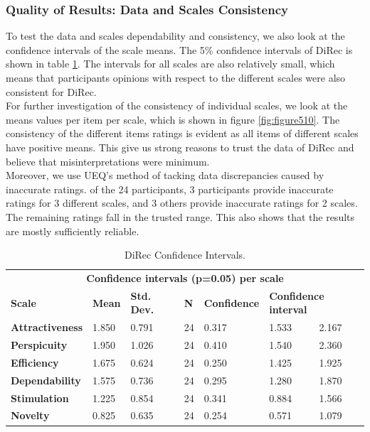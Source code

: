 \subsubsection{Quality of Results: Data and Scales Consistency}
To test the data and scales dependability and consistency, we also look at
the confidence intervals of the scale means. The 5\% confidence intervals of
DiRec is shown in table \ref{table:table57}. The intervals for all scales are
also relatively small, which means that participants opinions with respect to
the different scales were also consistent for DiRec.\\
For further investigation of the consistency of individual scales, we look at
the means values per item per scale, which is shown in figure
\ref{fig:figure510}. The consistency of the different items ratings is evident
as all items of different scales have positive means. This give us strong
reasons to trust the data of DiRec and believe that misinterpretations were
minimum.\\
Moreover, we use UEQ's method of tacking data discrepancies caused by
inaccurate ratings. of the 24 participants, 3 participants provide inaccurate
ratings for 3 different scales, and 3 others provide inaccurate ratings for 2
scales. The remaining ratings fall in the trusted range. This also shows that
the results are mostly sufficiently reliable.
\begin{table}[!htbp]
\tiny
\centering
\begin{tabular}{lllllll}
\multicolumn{7}{c}{\textbf{Confidence intervals (p=0.05) per scale}}                                                                               \\
\textbf{Scale}          & \textbf{Mean} & \textbf{Std. Dev.} & \textbf{N} & \textbf{Confidence} & \multicolumn{2}{l}{\textbf{Confidence interval}} \\
\textbf{Attractiveness} & 1.850         & 0.791              & 24         & 0.317               & 1.533                   & 2.167                  \\
\textbf{Perspicuity}    & 1.950         & 1.026              & 24         & 0.410               & 1.540                   & 2.360                  \\
\textbf{Efficiency}     & 1.675         & 0.624              & 24         & 0.250               & 1.425                   & 1.925                  \\
\textbf{Dependability}  & 1.575         & 0.736              & 24         & 0.295               & 1.280                   & 1.870                  \\
\textbf{Stimulation}    & 1.225         & 0.854              & 24         & 0.341               & 0.884                   & 1.566                  \\
\textbf{Novelty}        & 0.825         & 0.635              & 24         & 0.254               & 0.571                   & 1.079                 
\end{tabular}
\caption{DiRec Confidence Intervals.}
\label{table:table57}
\end{table}

